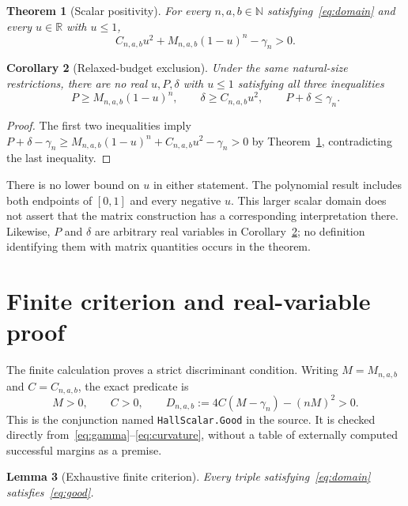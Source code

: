 \documentclass[11pt]{article}
\newtheorem{theorem}{Theorem}
\newtheorem{lemma}[theorem]{Lemma}
\newtheorem{corollary}[theorem]{Corollary}
\newcommand{\R}{\mathbb{R}}
\newcommand{\N}{\mathbb{N}}
\newcommand{\code}[1]{\texttt{\small #1}}
\begin{document}
\begin{theorem}[Scalar positivity]\label{thm:positive}
For every $n,a,b\in\N$ satisfying~\eqref{eq:domain} and every $u\in\R$
with $u\leq 1$,
\begin{equation}\label{eq:positive}
 C_{n,a,b}u^2+M_{n,a,b}(1-u)^n-\gamma_n>0.
\end{equation}
\end{theorem}

\begin{corollary}[Relaxed-budget exclusion]\label{cor:exclusion}
Under the same natural-size restrictions, there are no real $u,P,\delta$
with $u\leq 1$ satisfying all three inequalities
\begin{equation}\label{eq:budget}
 P\geq M_{n,a,b}(1-u)^n,\qquad
 \delta\geq C_{n,a,b}u^2,\qquad P+\delta\leq\gamma_n.
\end{equation}
\end{corollary}

\begin{proof}
The first two inequalities imply
$P+\delta-\gamma_n\geq M_{n,a,b}(1-u)^n+C_{n,a,b}u^2-\gamma_n>0$
by Theorem~\ref{thm:positive}, contradicting the last inequality.
\end{proof}

There is no lower bound on $u$ in either statement. The polynomial
result includes both endpoints of $[0,1]$ and every negative $u$.
This larger scalar domain does not assert that the matrix construction
has a corresponding interpretation there. Likewise, $P$ and $\delta$
are arbitrary real variables in Corollary~\ref{cor:exclusion}; no
definition identifying them with matrix quantities occurs in the theorem.

\section{Finite criterion and real-variable proof}

The finite calculation proves a strict discriminant condition. Writing
$M=M_{n,a,b}$ and $C=C_{n,a,b}$, the exact predicate is
\begin{equation}\label{eq:good}
 M>0,\qquad C>0,\qquad
 D_{n,a,b}:=4C(M-\gamma_n)-(nM)^2>0.
\end{equation}
This is the conjunction named \code{HallScalar.Good} in the source.
It is checked directly from~\eqref{eq:gamma}--\eqref{eq:curvature},
without a table of externally computed successful margins as a premise.

\begin{lemma}[Exhaustive finite criterion]\label{lem:finite}
Every triple satisfying~\eqref{eq:domain} satisfies~\eqref{eq:good}.
\end{lemma}
\end{document}
